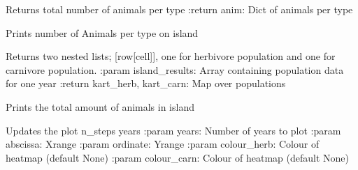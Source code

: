 \documentclass[a4paper,10pt,openany,oneside]{sphinxmanual}
\begin{document}
\begin{fulllineitems}
\begin{fulllineitems}
\label{simulation:biosim.simulation.BioSim.animal}
Returns total number of animals per type
:return anim: Dict of animals per type

\end{fulllineitems}


\begin{fulllineitems}
\label{simulation:biosim.simulation.BioSim.animals_by_species}
Prints number of Animals per type on island

\end{fulllineitems}


\begin{fulllineitems}
\label{simulation:biosim.simulation.BioSim.heatmap}
Returns two nested lists; {[}row{[}cell{]}{]}, one for herbivore population
and one for carnivore population.
:param island\_results: Array containing population data for one year
:return kart\_herb, kart\_carn: Map over populations

\end{fulllineitems}


\begin{fulllineitems}
\label{simulation:biosim.simulation.BioSim.per_cell_animal_count}
Prints the total amount of animals in island

\end{fulllineitems}


\begin{fulllineitems}
\label{simulation:biosim.simulation.BioSim.plot_update}
Updates the plot n\_steps years
:param years: Number of years to plot
:param abscissa: Xrange
:param ordinate: Yrange
:param colour\_herb: Colour of heatmap (default None)
:param colour\_carn: Colour of heatmap (default None)


\end{fulllineitems}
\end{fulllineitems}
\end{document}
